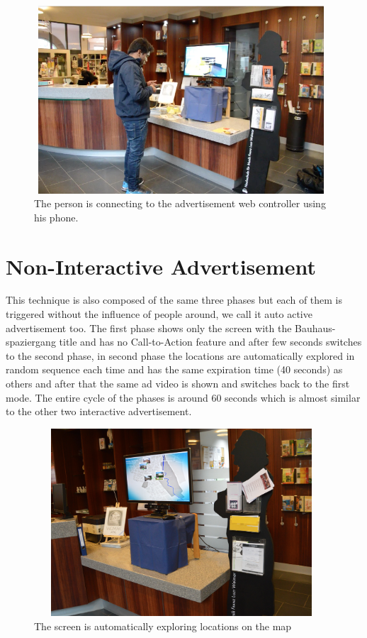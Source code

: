 \begin{figure}[H]
    \centering
    \includegraphics[width=110mm,height=70mm]{Figures/8/mobile_motivation}%
    \caption{The person is connecting to the advertisement web controller using his phone.}%
    \label{fig:mobilemotivationsystem}%
\end{figure}


\section{Non-Interactive Advertisement}
This technique is also composed of the same three phases but each of them is triggered without the influence of people around, we call it auto active advertisement too. The first phase shows only the screen with the Bauhaus-spaziergang title and has no Call-to-Action feature and after few seconds switches to the second phase, in second phase the locations are automatically explored in random sequence each time and has the same expiration time (40 seconds) as others and after that the same ad video is shown and switches back to the first mode. The entire cycle of the phases is around 60 seconds which is almost similar to the other two interactive advertisement.


\begin{figure}[H]
    \centering
    \includegraphics[width=110mm,height=70mm]{Figures/8/non_inter_screen}%
    \caption{The screen is automatically exploring locations on the map}%
    \label{fig:non-inteactivescreen}%
\end{figure}



